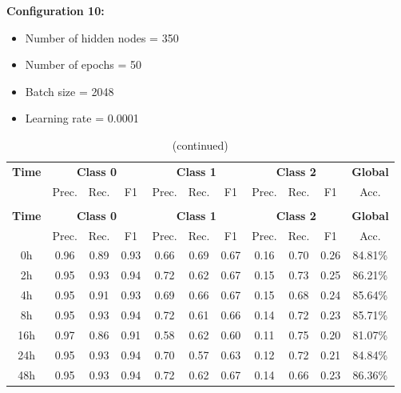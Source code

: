 \documentclass[12pt,oneside]{book} %
\begin{document}
\noindent \textbf{Configuration 10:}
\begin{multicols}{2}
    \begin{itemize}
        \item Number of hidden nodes = 350
        \item Number of epochs = 50
    \end{itemize}
    \begin{itemize}
         \item Batch size = 2048
         \item Learning rate = 0.0001
    \end{itemize}
\end{multicols}

\setlength\LTleft{1cm}
\begin{longtable}{ c ccc ccc ccc c}
\caption{Performance metrics of the LNN model for configuration 10} \\
\toprule
\textbf{Time} & \multicolumn{3}{c}{\textbf{Class 0}} & \multicolumn{3}{c}{\textbf{Class 1}} & \multicolumn{3}{c}{\textbf{Class 2}} & \textbf{Global} \\
               & Prec. & Rec. & F1  & Prec. & Rec. & F1   & Prec. & Rec. & F1  & Acc. \\
\midrule
\endfirsthead

\caption[]{(continued)} \\
\toprule
\textbf{Time} & \multicolumn{3}{c}{\textbf{Class 0}} & \multicolumn{3}{c}{\textbf{Class 1}} & \multicolumn{3}{c}{\textbf{Class 2}} & \textbf{Global} \\
               & Prec. & Rec. & F1  & Prec. & Rec. & F1   & Prec. & Rec. & F1  & Acc. \\
\midrule
\endhead

\bottomrule
\endfoot

\bottomrule
\endlastfoot

0h   & 0.96  & 0.89 & 0.93 & 0.66  & 0.69 & 0.67  & 0.16  & 0.70 & 0.26 & 84.81\% \\
2h   & 0.95  & 0.93 & 0.94 & 0.72  & 0.62 & 0.67  & 0.15  & 0.73 & 0.25 & 86.21\% \\
4h   & 0.95  & 0.91 & 0.93 & 0.69  & 0.66 & 0.67  & 0.15  & 0.68 & 0.24 & 85.64\% \\
8h   & 0.95  & 0.93 & 0.94 & 0.72  & 0.61 & 0.66  & 0.14  & 0.72 & 0.23 & 85.71\% \\
16h  & 0.97  & 0.86 & 0.91 & 0.58  & 0.62 & 0.60  & 0.11  & 0.75 & 0.20 & 81.07\% \\
24h  & 0.95  & 0.93 & 0.94 & 0.70  & 0.57 & 0.63  & 0.12  & 0.72 & 0.21 & 84.84\% \\
48h  & 0.95  & 0.93 & 0.94 & 0.72  & 0.62 & 0.67  & 0.14  & 0.66 & 0.23 & 86.36\% \\
\end{longtable}
\end{document}
